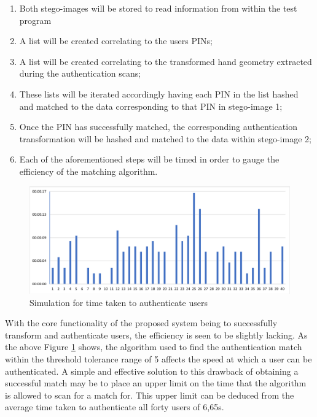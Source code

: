 \begin{enumerate}[label=\roman*.]
    \item Both stego-images will be stored to read information from within the test program
    \item A list will be created correlating to the users PINs;
    \item A list will be created correlating to the transformed hand geometry extracted during the authentication scans;
    \item These lists will be iterated accordingly having each PIN in the list hashed and matched to the data corresponding to that PIN in stego-image 1;
    \item Once the PIN has successfully matched, the corresponding authentication transformation will be hashed and matched to the data within stego-image 2;
    \item Each of the aforementioned steps will be timed in order to gauge the efficiency of the matching algorithm.
    
\end{enumerate}

    
    \begin{figure}[htbp!] 
    \centering    
    \includegraphics[width=1.0\textwidth]{Chapter4/Figs/AuthTest1.png}
    \caption[Simulation for time taken to authenticate users]{Simulation for time taken to authenticate users}
    \label{fig:Simulation for time taken to authenticate users}
    \end{figure}
    
With the core functionality of the proposed system being to successfully transform and authenticate users, the efficiency is seen to be slightly lacking. As the above Figure \ref{fig:Simulation for time taken to authenticate users} shows, the algorithm used to find the authentication match within the threshold tolerance range of 5 affects the speed at which a user can be authenticated. A simple and effective solution to this drawback of obtaining a successful match may be to place an upper limit on the time that the algorithm is allowed to scan for a match for. This upper limit can be deduced from the average time taken to authenticate all forty users of 6,65s. 


